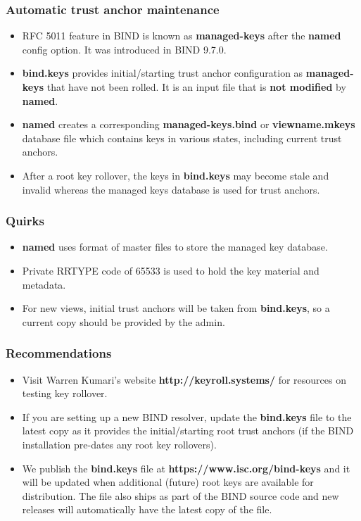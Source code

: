 \documentclass{beamer}
\begin{document}
\frame
{
  \frametitle{Automatic trust anchor maintenance}

  \begin{itemize}

  \item RFC 5011 feature in BIND is known as \textbf{managed-keys} after
    the \textbf{named} config option. It was introduced in BIND 9.7.0.

  \item \textbf{bind.keys} provides initial/starting trust anchor
    configuration as \textbf{managed-keys} that have not been rolled. It
    is an input file that is \textbf{not modified} by \textbf{named}.

  \item \textbf{named} creates a corresponding
    \textbf{managed-keys.bind} or \textbf{viewname.mkeys} database file
    which contains keys in various states, including current trust
    anchors.

  \item After a root key rollover, the keys in \textbf{bind.keys} may
    become stale and invalid whereas the managed keys database is used
    for trust anchors.

  \end{itemize}
}

\frame
{
  \frametitle{Quirks}

  \begin{itemize}
    \item \textbf{named} uses format of master files to store the
      managed key database.
    \item Private RRTYPE code of 65533 is used to hold the key material
      and metadata.
    \item For new views, initial trust anchors will be taken from
      \textbf{bind.keys}, so a current copy should be provided by the
      admin.
  \end{itemize}
}

\frame
{
  \frametitle{Recommendations}

  \begin{itemize}
  \item Visit Warren Kumari's website \textbf{http://keyroll.systems/}
    for resources on testing key rollover.

  \item If you are setting up a new BIND resolver, update the
    \textbf{bind.keys} file to the latest copy as it provides the
    initial/starting root trust anchors (if the BIND installation
    pre-dates any root key rollovers).

  \item We publish the \textbf{bind.keys} file at
    \textbf{https://www.isc.org/bind-keys} and it will be updated when
    additional (future) root keys are available for distribution. The
    file also ships as part of the BIND source code and new releases
    will automatically have the latest copy of the file.
  \end{itemize}

}
\end{document}
